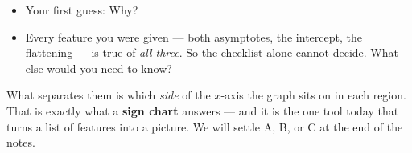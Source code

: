 \documentclass[10pt]{article}
\begin{document}
\begin{hookbox}
\begin{center}
\end{center}
\vspace{-2pt}
\begin{itemize}\setlength{\itemsep}{2pt}
  \item Your first guess: \blank{1.0cm} \quad Why? \writeline
  \item Every feature you were given --- both asymptotes, the intercept, the flattening --- is true of
        \emph{all three}. So the checklist alone cannot decide. What else would you need to know?
        \writeline
\end{itemize}
\vspace{-2pt}
What separates them is which \emph{side} of the $x$-axis the graph sits on in each region. That is
exactly what a \textbf{sign chart} answers --- and it is the one tool today that turns a list of
features into a picture. We will settle A, B, or C at the end of the notes.
\end{hookbox}
\end{document}
